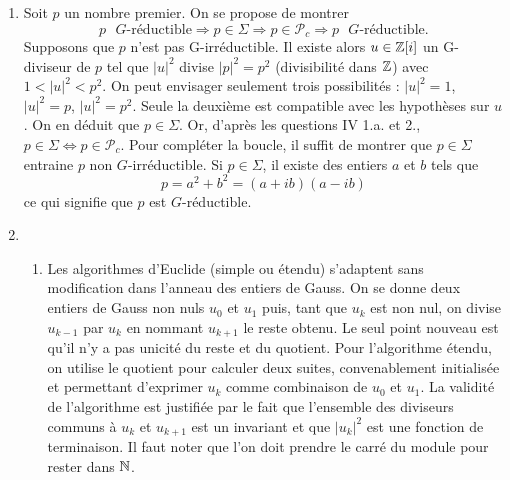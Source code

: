 \begin{enumerate}
\item Soit $p$ un nombre premier. On se propose de montrer
\begin{displaymath}
 p \text{ $G$-réductible} \Rightarrow p \in \Sigma \Rightarrow p \in \mathcal{P}_c \Rightarrow p \text{ $G$-réductible}.
\end{displaymath}
Supposons que $p$ n'est pas G-irréductible. Il existe alors $u\in \mathbb{Z}[i]$ un G-diviseur de $p$ tel que  $|u|^2$ divise $|p|^2 = p^2$ (divisibilité dans $\mathbb{Z}$) avec $1 < |u|^2 < p^2$. On peut envisager seulement trois possibilités : $|u|^2=1$, $|u|^2=p$, $|u|^2=p^2$.\newline
Seule la deuxième est compatible avec les hypothèses sur $u$. On en déduit que $p\in \Sigma$.\newline
Or, d'après les questions IV 1.a. et 2., $p\in \Sigma \Leftrightarrow p \in \mathcal{P}_c$.\newline
Pour compléter la boucle, il suffit de montrer que $p \in \Sigma$ entraine $p$ non $G$-irréductible.
Si $p\in \Sigma$, il existe des entiers $a$ et $b$ tels que 
\begin{displaymath}
 p = a^2 + b^2 = (a+ib)(a-ib) 
\end{displaymath}
ce qui signifie que $p$ est $G$-réductible.

\item 
\begin{enumerate}
  \item Les algorithmes d'Euclide (simple ou étendu) s'adaptent sans modification dans l'anneau des entiers de Gauss. On se donne deux entiers de Gauss non nuls $u_0$ et $u_1$ puis, tant que $u_k$ est non nul, on divise $u_{k-1}$ par $u_k$ en nommant $u_{k+1}$ le reste obtenu. Le seul point nouveau est qu'il n'y a pas unicité du reste et du quotient. Pour l'algorithme étendu, on utilise le quotient pour calculer deux suites, convenablement initialisée et permettant d'exprimer $u_k$ comme combinaison de $u_0$ et $u_1$. La validité de l'algorithme est justifiée par le fait que l'ensemble des diviseurs communs à $u_k$ et $u_{k+1}$ est un invariant et que $|u_k|^2$ est une fonction de terminaison. Il faut noter que l'on doit prendre le carré du module pour rester dans $\mathbb{N}$.


\end{enumerate}
\end{enumerate}
